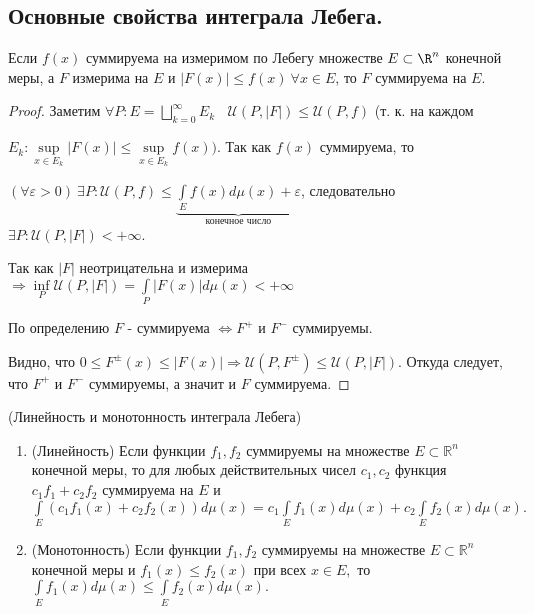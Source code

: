 \setcounter{theorem}{0}
\subsection{Основные свойства интеграла Лебега.}
\begin{lemma}
Если $f(x)$ суммируема на измеримом по Лебегу множестве $E \subset \R^n$ конечной меры, а $F$ измерима на $E$ и $|F(x)| \leqslant f(x)\ \forall x \in E$, то $F$ суммируема на $E$.
\end{lemma}
\begin{proof}
Заметим $\forall P: E = \bigsqcup\limits_{k=0}^{\infty}E_k\ \ \ \ \mathcal{U}(P, |F|) \leqslant \mathcal{U}(P, f)$ \Big(т. к. на каждом 

$E_k: \sup\limits_{x\in E_k} |F(x)| \leqslant \sup\limits_{x\in E_k} f\left(x\right)\Big)$.
Так как $f(x)$ суммируема, то 

$(\forall \varepsilon > 0)\ \exists P: \mathcal{U}(P,f) \leqslant \underbrace{\int\limits_E f(x)d\mu(x)+\varepsilon}_{\text{конечное число}}$, следовательно ${\exists P: \mathcal{U}(P, |F|) < +\infty}$.

Так как $|F|$ неотрицательна и измерима $ \Rightarrow \inf\limits_P \mathcal{U}(P, |F|) = \int\limits_P |F(x)|d\mu(x)<+\infty$

По определению $F$ - суммируема $\Leftrightarrow F^+ \text{ и } F^-$ суммируемы. 

Видно, что $0\leqslant F^\pm(x) \leqslant |F(x)| \Rightarrow \mathcal{U} (P,F^\pm) \leqslant \mathcal{U}(P,|F|)$. Откуда следует, что $F^+$ и $ F^-$ суммируемы, а значит и $F$ суммируема.
\end{proof}


\begin{theorem}(Линейность и монотонность интеграла Лебега)
\begin{enumerate}
\item(Линейность) Если функции $ f_1,f_2 $ суммируемы на множестве $ E\subset\mathbb{R}^n $ конечной меры, то для любых действительных чисел $ c_1,c_2 $ функция $ c_1f_1+c_2f_2 $ суммируема на $ E $ и $ \int\limits_E\left( c_1f_1(x)+c_2f_2(x)\right) d\mu(x)=c_1\int\limits_Ef_1(x)d\mu(x)+c_2\int\limits_Ef_2(x)d\mu(x). $

\item(Монотонность) Если функции $ f_1,f_2 $ суммируемы на множестве $ E\subset\mathbb{R}^n $ конечной меры и $ f_1(x)\leqslant f_2(x) $ при всех $ x\in E, $ то $ \int\limits_Ef_1(x)d\mu(x)\leqslant\int\limits_Ef_2(x)d\mu(x). $
\end{enumerate}
\end{theorem}


